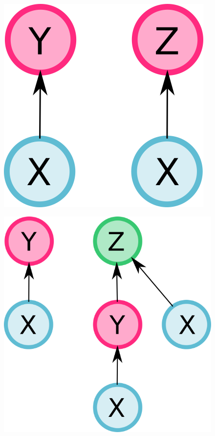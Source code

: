 \documentclass[12pt]{diazessay} %
\begin{document}
\begin{figure}[h]
	\centering
	\includegraphics[scale=0.4]{Figures/ex1input.png}
\end{figure}
\begin{figure}[h]
	\centering
	\includegraphics[scale=0.4]{Figures/ex2input.png}
\end{figure}
\end{document}

